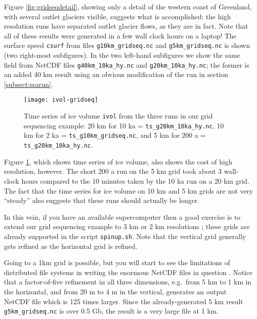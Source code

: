 Figure \ref{fig:gridseqdetail}, showing only a detail of the western coast of Greenland, with several outlet glaciers visible, suggests what is accomplished: the high resolution runs have separated outlet glacier flows, as they are in fact.  Note that all of these results were generated in a few wall clock hours on a laptop!  The surface speed \texttt{csurf} from files \texttt{g10km_gridseq.nc} and \texttt{g5km_gridseq.nc} is shown (two right-most subfigures).  In the two left-hand subfigures we show the same field from NetCDF files \texttt{g40km_10ka_hy.nc} and \texttt{g20km_10ka_hy.nc}; the former is an added 40 km result using an obvious modification of the run in section \ref{subsect:ssarun}.

\begin{figure}[ht]
\centering
\texttt{[image: ivol-gridseq]}
\caption{Time series of ice volume \texttt{ivol} from the three runs in our grid sequencing example: 20 km for 10 ka = \texttt{ts_g20km_10ka_hy.nc}, 10 km for 2 ka = \texttt{ts_g10km_gridseq.nc}, and 5 km for 200 a = \texttt{ts_g20km_10ka_hy.nc}.}
\label{fig:ivolgridseq}
\end{figure}

Figure \ref{fig:ivolgridseq}, which shows time series of ice volume, also shows the cost of high resolution, however.  The short 200 a run on the 5 km grid took about 3 wall-clock hours compared to the 10 minutes taken by the 10 ka run on a 20 km grid.  The fact that the time series for ice volume on 10 km and 5 km grids are not very ``steady'' also suggests that these runs should actually be longer.

In this vein, if you have an available supercomputer then a good exercise is to extend our grid sequencing example to 3 km or 2 km resolutions \cite{AschwandenAdalgeirsdottirKhroulev}; these grids are already supported in the script \texttt{spinup.sh}.  Note that the vertical grid generally gets refined as the horizontal grid is refined.

Going to a 1km grid is possible, but you will start to see the limitations of distributed file systems in writing the enormous NetCDF files in question \cite{DickensMorey2013}.  Notice that a factor-of-five refinement in all three dimensions, e.g.~from 5 km to 1 km in the horizontal, and from 20 m to 4 m in the vertical, generates an output NetCDF file which is 125 times larger.  Since the already-generated 5 km result \texttt{g5km_gridseq.nc} is over 0.5 Gb, the result is a very large file at 1 km.

